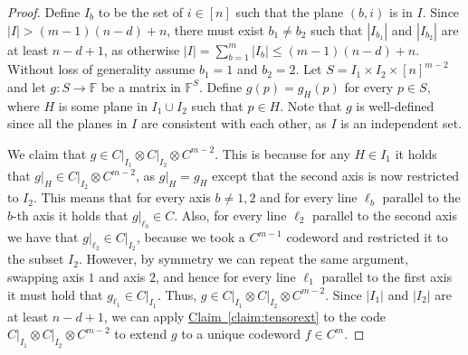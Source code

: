 \documentclass[11pt]{article}
\numberwithin{equation}{section}
\theoremstyle{definition}
\theoremstyle{plain}
\newcommand{\expref}[2]{\hyperref[#2]{#1~\ref{#2}}}
\theoremstyle{plain}
\newcommand{\colored}{}
\newcommand{\plane}{{\colored{H}}} %
\newcommand{\codedist}{\colored{d}} %
\newcommand{\blocklength}{\colored{n}} %
\newcommand{\closestlocalword}[1]{ \colored{g_{#1}}} %
\newcommand{\closestglobalword}{\colored{f}} %
\newcommand{\Field}{\colored{\mathbb F}}
\newcommand\abs[1]{\colored{\left|#1\right|}}
\begin{document}
\begin{proof}
Define $I_b$ to be the set of $i \in [\blocklength]$ such that the plane $(b,i)$ is in $I$. Since $\abs{I} > (m-1)(\blocklength-\codedist) + \blocklength$, there must exist $b_1 \ne b_2$ such that $\abs{I_{b_1}}$ and $\abs{I_{b_2}}$ are at least $\blocklength - \codedist + 1$, as otherwise $\abs{I} = \sum_{b= 1}^m \abs{I_b} \leq (m-1)(\blocklength - \codedist) + \blocklength$. Without loss of generality assume $b_1 = 1$ and $b_2 = 2$. Let $S = I_1 \times I_2 \times [\blocklength]^{m-2}$ and let $g \colon S \to \Field$ be a matrix in $\Field^{S}$. Define $g(p) = \closestlocalword{\plane}(p)$ for every $p \in S$, where $\plane$ is some plane in $I_1 \cup I_2$ such that $p \in \plane$. Note that $g$ is well-defined since all the planes in $I$ are consistent with each other, as $I$ is an independent set.

We claim that $g \in C \vert_{I_1} \otimes C \vert_{I_2} \otimes C^{m-2}$. This is because for any $\plane \in I_1$ it holds that $g \vert_{\plane} \in C \vert_{I_2} \otimes C^{m-2}$, as $g \vert_{\plane} = \closestlocalword{\plane}$ except that the second axis is now restricted to $I_2$.
This means that for every axis $b \ne 1,2$ and for every line $\ell_b$ parallel to the $b$-th axis it holds that $g \vert_{\ell_b} \in C$.
Also, for every line $\ell_2$ parallel to the second axis we have that $g \vert_{\ell_2} \in C \vert_{I_2}$, because we took a $C^{m-1}$ codeword and restricted it to the subset $I_2$.
However, by symmetry we can repeat the same argument, swapping axis $1$ and axis $2$, and hence for every line $\ell_1$ parallel to the first axis it must hold that $g_{\ell_1} \in C \vert_{I_1}$.
Thus, $g \in C \vert_{I_1} \otimes C \vert_{I_2} \otimes C^{m-2}$. Since $\abs{I_1}$ and $\abs{I_2}$ are at least $\blocklength - \codedist + 1$, we can apply \expref{Claim}{claim:tensorext} to the code $C \vert_{I_1} \otimes C \vert_{I_2} \otimes C^{m-2}$ to extend $g$ to a unique codeword $\closestglobalword \in C^m$.



\end{proof}
\end{document}

